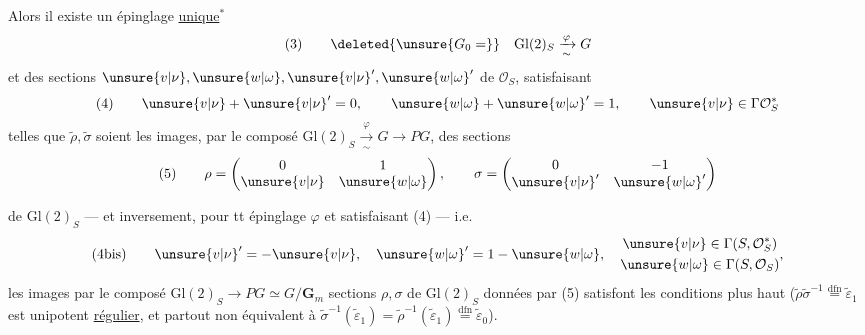 Alors il existe un épinglage \uline{unique}$^*$
\[
(3)\qquad\deleted{\unsure{G_0=}}\quad\mathrm{Gl}(2)_S\xrightarrow[\sim]{\varphi}G
\]
et des sections $\unsure{v|\nu},\unsure{w|\omega},\unsure{v|\nu}',\unsure{w|\omega}'$ de $\mathcal O_S$, satisfaisant
\[
(4)\qquad \unsure{v|\nu}+\unsure{v|\nu}'=0,\qquad \unsure{w|\omega}+\unsure{w|\omega}'=1,\qquad \unsure{v|\nu}\in\Gamma\mathcal O_S^*
\]
telles que $\widetilde\rho,\widetilde\sigma$ soient les images, par le composé $\mathrm{Gl}(2)_S\xrightarrow[\sim]{\varphi}G\longrightarrow PG$, des sections
\[
(5)\qquad \rho=\begin{pmatrix}0&1\\\unsure{v|\nu}&\unsure{w|\omega}\end{pmatrix},\qquad
\sigma=\begin{pmatrix}0&-1\\\unsure{v|\nu}'&\unsure{w|\omega}'\end{pmatrix}
\]

de $\mathrm{Gl}(2)_S$ --- et inversement, pour tt épinglage $\varphi$ et   satisfaisant (4) --- i.e.
\[
(4\mathrm{bis})\qquad \unsure{v|\nu}'=-\unsure{v|\nu},\quad \unsure{w|\omega}'=1-\unsure{w|\omega},\quad\begin{gathered}\unsure{v|\nu}\in\Gamma(S,\mathcal O_S^*)\\\unsure{w|\omega}\in\Gamma(S,\mathcal O_S)\end{gathered},
\]
les images \inserted{$\widetilde\rho,\widetilde\sigma$} par le composé $\mathrm{Gl}(2)_S\longrightarrow PG\simeq G/\mathbf G_m$  sections $\rho,\sigma$ de $\mathrm{Gl}(2)_S$ données par (5) satisfont les conditions plus haut ($\widetilde\rho\widetilde\sigma^{-1}\overset{\mathrm{dfn}}=\widetilde\varepsilon_1$ est unipotent \uline{régulier}, et partout non équivalent à $\widetilde\sigma^{-1}(\widetilde\varepsilon_1)=\widetilde\rho^{-1}(\widetilde\varepsilon_1)\overset{\mathrm{dfn}}=\widetilde\varepsilon_0$).

